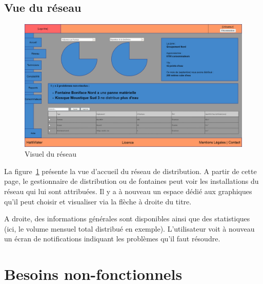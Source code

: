 \documentclass[a4paper, 11pt]{article}
\begin{document}
  \subsection{Vue du réseau}
    \begin{figure}[H]
        \includegraphics[width=\textwidth]{Cahier_des_Charges/reseau}
        \caption{Visuel du réseau}
        \label{fig:network}
    \end{figure}
    La figure~\ref{fig:network} présente la vue d'accueil du réseau de distribution. A partir de cette page, le gestionnaire de distribution ou de fontaines peut voir les installations du réseau qui lui sont attribuées. Il y a à nouveau un espace dédié aux graphiques qu'il peut choisir et visualiser via la flèche à droite du titre.

    A droite, des informations générales sont disponibles ainsi que des statistiques (ici, le volume mensuel total distribué en exemple).
    L'utilisateur voit à nouveau un écran de notifications indiquant les problèmes qu'il faut résoudre.

\section{Besoins non-fonctionnels}
\end{document}
